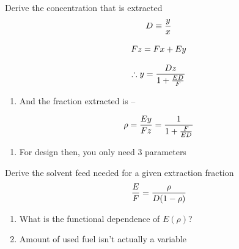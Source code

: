 \documentclass[aspectratio=1610,pdftex,dvipsnames,compress,xcolor={dvipsnames}]{beamer}
\begin{document}
\begin{frame}{Derive the concentration that is extracted}
    \begin{equation}
        \LARGE
        D \equiv \frac{y}{x}
    \end{equation}
    
    \begin{equation}
        \LARGE
        Fz = Fx + Ey
    \end{equation}
    
    \begin{equation}
        \LARGE
        \therefore y = \frac{Dz}{1+\frac{ED}{F}}
    \end{equation}
    
    \vspace*{\fill}

    \begin{enumerate}[topsep=0pt,itemsep=18pt,leftmargin=*,label=(\arabic*)]
        \item[]And the fraction extracted is -- 
    \end{enumerate}

    \vspace*{\fill}

    \begin{equation}
        \LARGE
        \rho = \frac{Ey}{Fz} = \frac{1}{1+\frac{F}{ED}}
    \end{equation}

    \vspace*{\fill}

    \begin{enumerate}[topsep=0pt,itemsep=18pt,leftmargin=*,label=(\arabic*)]
        \item[]For design then, you only need 3 parameters
    \end{enumerate}
\end{frame}


\begin{frame}{Derive the solvent feed needed for a given extraction fraction}
    \begin{equation}
        \LARGE
        \frac{E}{F} = \frac{\rho}{D(1 - \rho)}
    \end{equation}
    
    \vspace*{\fill}

    \begin{enumerate}[topsep=0pt,itemsep=21pt,leftmargin=*,label=(\arabic*)]
        \item[]What is the functional dependence of $E(\rho)$?
        \item[]Amount of used fuel isn't actually a variable 
    \end{enumerate}
\end{frame}
\end{document}
